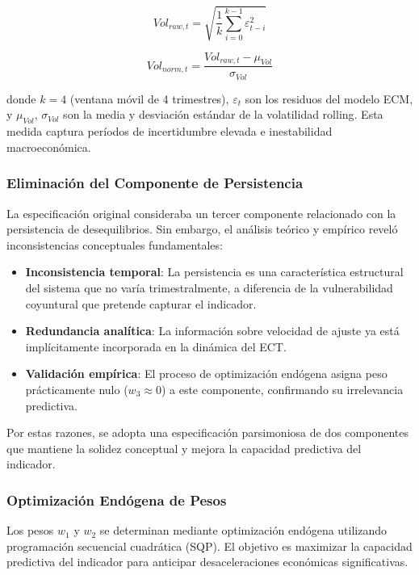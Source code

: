 \documentclass[3p,11pt]{elsarticle}
\begin{document}
\begin{equation}
Vol_{raw,t} = \sqrt{\frac{1}{k} \sum_{i=0}^{k-1} \varepsilon_{t-i}^2}
\label{eq:volatilidad_raw}
\end{equation}

\begin{equation}
Vol_{norm,t} = \frac{Vol_{raw,t} - \mu_{Vol}}{\sigma_{Vol}}
\label{eq:volatilidad_norm}
\end{equation}

donde $k = 4$ (ventana móvil de 4 trimestres), $\varepsilon_t$ son los residuos del modelo ECM, y $\mu_{Vol}$, $\sigma_{Vol}$ son la media y desviación estándar de la volatilidad rolling. Esta medida captura períodos de incertidumbre elevada e inestabilidad macroeconómica.

\subsubsection{Eliminación del Componente de Persistencia}

La especificación original consideraba un tercer componente relacionado con la persistencia de desequilibrios. Sin embargo, el análisis teórico y empírico reveló inconsistencias conceptuales fundamentales:

\begin{itemize}
    \item \textbf{Inconsistencia temporal}: La persistencia es una característica estructural del sistema que no varía trimestralmente, a diferencia de la vulnerabilidad coyuntural que pretende capturar el indicador.
    \item \textbf{Redundancia analítica}: La información sobre velocidad de ajuste ya está implícitamente incorporada en la dinámica del ECT.
    \item \textbf{Validación empírica}: El proceso de optimización endógena asigna peso prácticamente nulo ($w_3 \approx 0$) a este componente, confirmando su irrelevancia predictiva.
\end{itemize}

Por estas razones, se adopta una especificación parsimoniosa de dos componentes que mantiene la solidez conceptual y mejora la capacidad predictiva del indicador.

\subsubsection{Optimización Endógena de Pesos}

Los pesos $w_1$ y $w_2$ se determinan mediante optimización endógena utilizando programación secuencial cuadrática (SQP). El objetivo es maximizar la capacidad predictiva del indicador para anticipar desaceleraciones económicas significativas.
\end{document}
